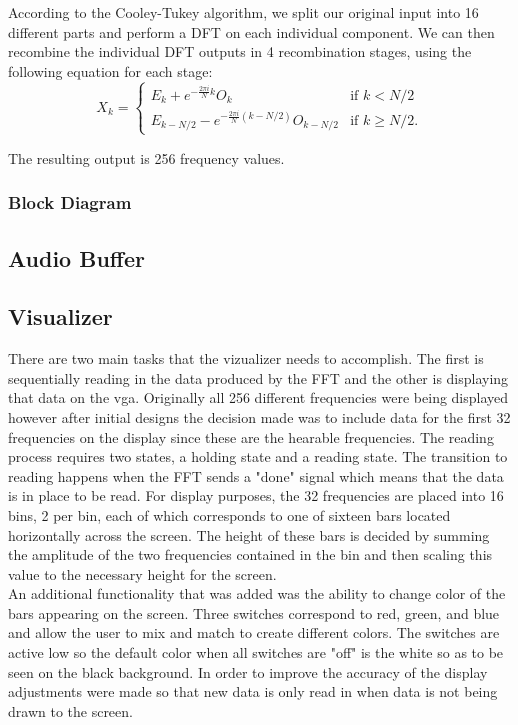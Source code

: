 \documentclass{article}
\begin{document}
	According to the Cooley-Tukey algorithm, 
	we split our original input into 16 different parts and perform a DFT on each
	individual component. We can then recombine the individual DFT outputs in 4
	recombination stages, using the following equation for each stage: 
	$$
	X_k = \left\{
	\begin{matrix}
		E_k + e^{-\frac{2\pi i}{N}k} O_k		& 	\mbox{if } k < N/2 \\ 
		E_{k-N/2} - e^{-\frac{2\pi i}{N} (k-N/2)} O_{k-N/2} & 	\mbox{if }
		k \geq N/2. 
	\end{matrix} 
	\right. 
	$$
	
	The resulting output is 256 frequency values.
	
	\subsubsection{Block Diagram}
	

\subsection{Audio Buffer}

\subsection{Visualizer} There are two main tasks that the vizualizer needs to accomplish.  The first is sequentially reading in the data produced by the FFT and the other is displaying that data on the vga.  Originally all 256 different frequencies were being displayed however after initial designs the decision made was to include data for the first 32 frequencies on the display since these are the hearable frequencies.  The reading process requires two states, a holding state and a reading state.  The transition to reading happens when the FFT sends a "done" signal which means that the data is in place to be read.  For display purposes, the 32 frequencies are placed into 16 bins, 2 per bin, each of which corresponds to one of sixteen bars located horizontally across the screen.  The height of these bars is decided by summing the amplitude of the two frequencies contained in the bin and then scaling this value to the necessary height for the screen.\\An additional functionality that was added was the ability to change color of the bars appearing on the screen.  Three switches correspond to red, green, and blue and allow the user to mix and match to create different colors.  The switches are active low so the default color when all switches are "off" is the white so as to be seen on the black background.  In order to improve the accuracy of the display adjustments were made so that new data is only read in when data is not being drawn to the screen.
\end{document}
